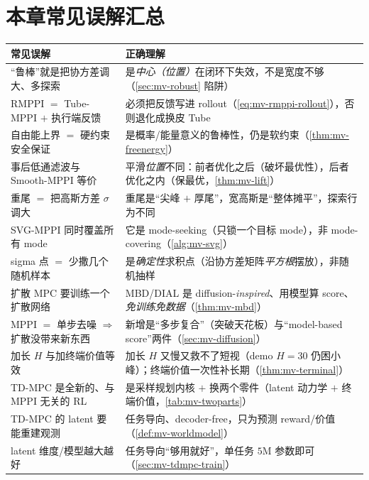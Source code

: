 \section*{本章常见误解汇总}
\begin{table}[H]\centering\small
\begin{tabular}{p{} p{}}
\toprule
\textbf{常见误解} & \textbf{正确理解} \\
\midrule
“鲁棒”就是把协方差调大、多探索 & 是\emph{中心（位置）}在闭环下失效，不是宽度不够（\cref{sec:mv-robust} 陷阱）\\
RMPPI $=$ Tube-MPPI $+$ 执行端反馈 & 必须把反馈写进 rollout（\cref{eq:mv-rmppi-rollout}），否则退化成换皮 Tube \\
自由能上界 $=$ 硬约束安全保证 & 是概率/能量意义的鲁棒性，仍是软约束（\cref{thm:mv-freenergy}）\\
事后低通滤波与 Smooth-MPPI 等价 & 平滑\emph{位置}不同：前者优化之后（破坏最优性），后者优化之内（保最优，\cref{thm:mv-lift}）\\
重尾 $=$ 把高斯方差 $\sigma$ 调大 & 重尾是“尖峰 $+$ 厚尾”，宽高斯是“整体摊平”，探索行为不同 \\
SVG-MPPI 同时覆盖所有 mode & 它是 mode-seeking（只锁一个目标 mode），非 mode-covering（\cref{alg:mv-svg}）\\
sigma 点 $=$ 少撒几个随机样本 & 是\emph{确定性}求积点（沿协方差矩阵\emph{平方根}摆放），非随机抽样 \\
扩散 MPC 要训练一个扩散网络 & MBD/DIAL 是 diffusion-\emph{inspired}、用模型算 score、\emph{免训练免数据}（\cref{thm:mv-mbd}）\\
MPPI $=$ 单步去噪 $\Rightarrow$ 扩散没带来新东西 & 新增是“多步复合”（突破天花板）与“model-based score”两件（\cref{sec:mv-diffusion}）\\
加长 $H$ 与加终端价值等效 & 加长 $H$ 又慢又救不了短视（demo $H{=}30$ 仍困小峰）；终端价值一次性补长期（\cref{thm:mv-terminal}）\\
TD-MPC 是全新的、与 MPPI 无关的 RL & 是采样规划内核 $+$ 换两个零件（latent 动力学 $+$ 终端价值，\cref{tab:mv-twoparts}）\\
TD-MPC 的 latent 要能重建观测 & 任务导向、decoder-free，只为预测 reward/价值（\cref{def:mv-worldmodel}）\\
latent 维度/模型越大越好 & 任务导向“够用就好”，单任务 $5$M 参数即可（\cref{sec:mv-tdmpc-train}）\\
\bottomrule
\end{tabular}
\end{table}

